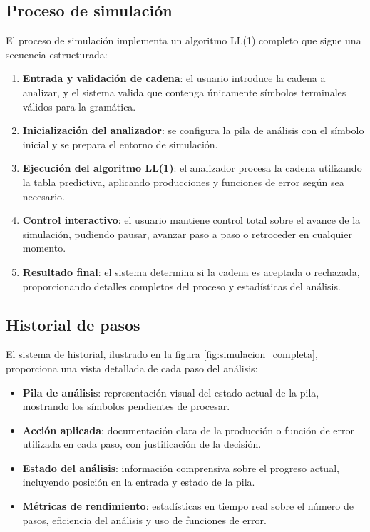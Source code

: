\subsection{Proceso de simulación}

El proceso de simulación implementa un algoritmo LL(1) completo que sigue una secuencia estructurada:

\begin{enumerate}
    \item \textbf{Entrada y validación de cadena}: el usuario introduce la cadena a analizar, y el sistema valida que contenga únicamente símbolos terminales válidos para la gramática.
    \item \textbf{Inicialización del analizador}: se configura la pila de análisis con el símbolo inicial y se prepara el entorno de simulación.
    \item \textbf{Ejecución del algoritmo LL(1)}: el analizador procesa la cadena utilizando la tabla predictiva, aplicando producciones y funciones de error según sea necesario.
    \item \textbf{Control interactivo}: el usuario mantiene control total sobre el avance de la simulación, pudiendo pausar, avanzar paso a paso o retroceder en cualquier momento.
    \item \textbf{Resultado final}: el sistema determina si la cadena es aceptada o rechazada, proporcionando detalles completos del proceso y estadísticas del análisis.
\end{enumerate}

\subsection{Historial de pasos}

El sistema de historial, ilustrado en la figura \ref{fig:simulacion_completa}, proporciona una vista detallada de cada paso del análisis:

\begin{itemize}
    \item \textbf{Pila de análisis}: representación visual del estado actual de la pila, mostrando los símbolos pendientes de procesar.
    \item \textbf{Acción aplicada}: documentación clara de la producción o función de error utilizada en cada paso, con justificación de la decisión.
    \item \textbf{Estado del análisis}: información comprensiva sobre el progreso actual, incluyendo posición en la entrada y estado de la pila.
    \item \textbf{Métricas de rendimiento}: estadísticas en tiempo real sobre el número de pasos, eficiencia del análisis y uso de funciones de error.
\end{itemize}

